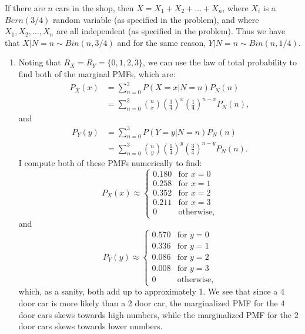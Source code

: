 \begin{problem}{11} If there are $n$ cars in the shop, then $X = X_1+X_2+ \ldots+ X_n$, where $X_i$ is a $Bern(3/4)$ random variable (as specified in the problem), and where $X_1, X_2, \ldots, X_n$ are all independent (as specified in the problem).  Thus we have that $X|N=n \sim Bin(n, 3/4)$ and for the same reason, $Y|N=n \sim Bin(n, 1/4)$.

\begin{enumerate}

\item Noting that $R_X=R_Y = \{ 0, 1, 2, 3 \}$, we can use the law of total probability to find both of the marginal PMFs, which are:
\begin{align*}
P_X(x) &= \sum_{n=0}^3 P(X=x|N=n)P_N(n) \\
& =  \sum_{n=0}^3 \binom{n}{x} \left( \frac{3}{4} \right)^x \left(\frac{1}{4} \right)^{n-x}P_N(n),
\end{align*}
and 
\begin{align*}
P_Y(y) &= \sum_{n=0}^3 P(Y=y|N=n)P_N(n) \\
& =  \sum_{n=0}^3 \binom{n}{y} \left( \frac{1}{4} \right)^y \left(\frac{3}{4} \right)^{n-y}P_N(n).
\end{align*}
I compute both of these PMFs numerically to find:
\[
  P_{X}(x) \approx
  \begin{cases}
                                   0.180 & \text{for $x=0$} \\
                                   0.258 & \text{for $x=1$} \\
                                  0.352 & \text{for $x=2$} \\
                                  0.211& \text{for $x=3$} \\
                                  0& \text{otherwise},
   \end{cases}
\]
and
\[
  P_{Y}(y) \approx
  \begin{cases}
                                   0.570 & \text{for $y=0$} \\
                                   0.336 & \text{for $y=1$} \\
                                  0.086 & \text{for $y=2$} \\
                                  0.008& \text{for $y=3$} \\
                                  0& \text{otherwise},
   \end{cases}
\]
which, as a sanity, both add up to approximately 1.  We see that since a 4 door car is more likely than a 2 door car, the marginalized PMF for the 4 door cars skews towards high numbers, while the marginalized PMF for the 2 door cars skews towards lower numbers.


\end{enumerate}
\end{problem}
